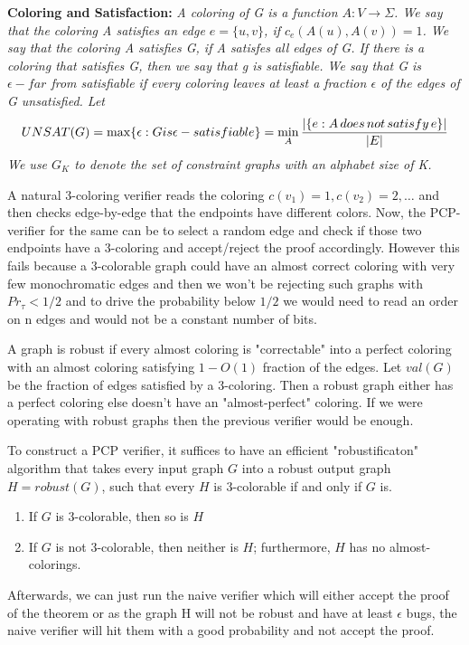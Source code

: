 \textbf{Coloring and Satisfaction:} \textit{A coloring of G is a function $A : V \rightarrow \Sigma$. We say that the coloring A satisfies an edge $e = \{u,v\}$, if $c_e(A(u),A(v)) = 1$. We say that the coloring A satisfies G, if A satisfes all edges of G. If there is a coloring that satisfies G, then we say that g is satisfiable. We say that G is $\epsilon-far$ from satisfiable if every coloring leaves at least a fraction $\epsilon$ of the edges of G unsatisfied. Let $$UNSAT(G) = \max \{\epsilon : G is \epsilon -satisfiable\} = \min_A \frac{\arrowvert\{e : A\,does\,not\,satisfy\,e\}\arrowvert}{\arrowvert E \arrowvert}$$ We use $G_K$ to denote the set of constraint graphs with an alphabet size of K.}

A natural 3-coloring verifier reads the coloring $c(v_1) = 1, c(v_2)=2,\ldots$ and then checks edge-by-edge that the endpoints have different colors. Now, the PCP-verifier for the same can be to select a random edge and check if those two endpoints have a 3-coloring and accept/reject the proof accordingly. However this fails because a 3-colorable graph could have an almost correct coloring with very few monochromatic edges and then we won't be rejecting such graphs with $Pr_{\tau} < 1/2$ and to drive the probability below $1/2$ we would need to read an order on n edges and would not be a constant number of bits.

A graph is robust if  every almost coloring is "correctable" into a perfect coloring with an almost coloring satisfying $1-O(1)$ fraction of the edges. Let $val(G)$ be the fraction of edges satisfied by a 3-coloring. Then a robust graph either has a perfect coloring else doesn't have an "almost-perfect" coloring. If we were operating with robust graphs then the previous verifier would be enough.

To construct a PCP verifier, it suffices to have an efficient "robustificaton" algorithm that takes every input graph $G$ into a robust output graph $H = robust(G)$, such that every $H$ is 3-colorable if and only if $G$ is. 
\begin{enumerate}
    \item If $G$ is 3-colorable, then so is $H$
    \item If $G$ is not 3-colorable, then neither is $H$; furthermore, $H$ has no almost-colorings.
\end{enumerate} 

Afterwards, we can just run the naive verifier which will either accept the proof of the theorem or as the graph H will not be robust and have at least $\epsilon$ bugs, the naive verifier will hit them with a good probability and not accept the proof.


